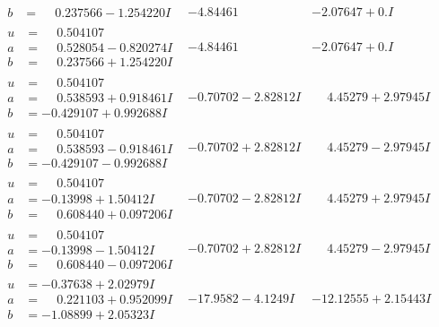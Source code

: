 \documentclass[1p]{elsarticle_modified}
\theoremstyle{definition}
\begin{document}
$$\begin{array}{c|c|c}
\begin{aligned}
b &= \phantom{-}0.237566 - 1.254220 I\end{aligned}
 & -4.84461\phantom{ +0.000000I} & -2.07647 + 0. I\phantom{ +0.000000I} \\ \hline\begin{aligned}
u &= \phantom{-}0.504107\phantom{ +0.000000I} \\
a &= \phantom{-}0.528054 - 0.820274 I \\
b &= \phantom{-}0.237566 + 1.254220 I\end{aligned}
 & -4.84461\phantom{ +0.000000I} & -2.07647 + 0. I\phantom{ +0.000000I} \\ \hline\begin{aligned}
u &= \phantom{-}0.504107\phantom{ +0.000000I} \\
a &= \phantom{-}0.538593 + 0.918461 I \\
b &= -0.429107 + 0.992688 I\end{aligned}
 & -0.70702 - 2.82812 I & \phantom{-}4.45279 + 2.97945 I \\ \hline\begin{aligned}
u &= \phantom{-}0.504107\phantom{ +0.000000I} \\
a &= \phantom{-}0.538593 - 0.918461 I \\
b &= -0.429107 - 0.992688 I\end{aligned}
 & -0.70702 + 2.82812 I & \phantom{-}4.45279 - 2.97945 I \\ \hline\begin{aligned}
u &= \phantom{-}0.504107\phantom{ +0.000000I} \\
a &= -0.13998 + 1.50412 I \\
b &= \phantom{-}0.608440 + 0.097206 I\end{aligned}
 & -0.70702 - 2.82812 I & \phantom{-}4.45279 + 2.97945 I \\ \hline\begin{aligned}
u &= \phantom{-}0.504107\phantom{ +0.000000I} \\
a &= -0.13998 - 1.50412 I \\
b &= \phantom{-}0.608440 - 0.097206 I\end{aligned}
 & -0.70702 + 2.82812 I & \phantom{-}4.45279 - 2.97945 I \\ \hline\begin{aligned}
u &= -0.37638 + 2.02979 I \\
a &= \phantom{-}0.221103 + 0.952099 I \\
b &= -1.08899 + 2.05323 I\end{aligned}
 & -17.9582 - 4.1249 I & -12.12555 + 2.15443 I \\ \hline\begin{aligned}

\end{aligned}
\end{array}$$
\end{document}
